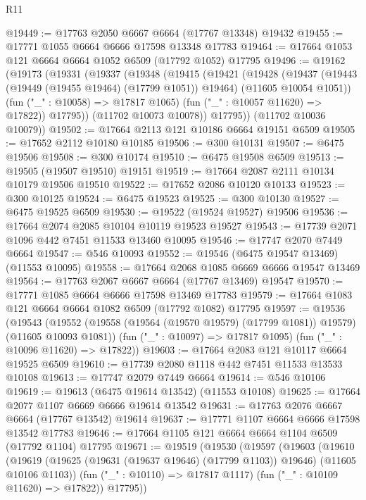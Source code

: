 \begin{lexlean}{R11}
\begin{coremodule}
{{{{{{{{{{{{{{{{{{{{{{{{{{{{{{{{{{{{{{{{{{{{{{{{{{{{{{{{{{{{{{{{{{{{{{{{{{{{{{{{{{@19449 := @17763 @2050 @6667 @6664 (@17767 @13348) @19432
@19455 := @17771 @1055 @6664 @6666 @17598 @13348 @17783
@19464 := @17664 @1053 @121 @6664 @6664 @1052 @6509 (@17792 @1052) @17795
@19496 := @19162
    (@19173
      (@19331
        (@19337
          (@19348
            (@19415
              (@19421
                (@19428
                  (@19437
                    (@19443 (@19449 (@19455 @19464) (@17799 @1051)) @19464)
                    (@11605 @10054 @1051))
                  (fun ("_" : @10058) => @17817 @1065)
                  (fun ("_" : @10057 @11620) => @17822))
                @17795))
            (@11702 @10073 @10078))
          @17795))
      (@11702 @10036 @10079))
@19502 := @17664 @2113 @121 @10186 @6664 @19151 @6509
@19505 := @17652 @2112 @10180 @10185
@19506 := @300 @10131
@19507 := @6475 @19506
@19508 := @300 @10174
@19510 := @6475 @19508 @6509
@19513 := @19505 (@19507 @19510) @19151
@19519 := @17664 @2087 @2111 @10134 @10179 @19506 @19510
@19522 := @17652 @2086 @10120 @10133
@19523 := @300 @10125
@19524 := @6475 @19523
@19525 := @300 @10130
@19527 := @6475 @19525 @6509
@19530 := @19522 (@19524 @19527) @19506
@19536 := @17664 @2074 @2085 @10104 @10119 @19523 @19527
@19543 := @17739 @2071 @1096 @442 @7451 @11533 @13460 @10095
@19546 := @17747 @2070 @7449 @6664
@19547 := @546 @10093
@19552 := @19546 (@6475 @19547 @13469) (@11553 @10095)
@19558 := @17664 @2068 @1085 @6669 @6666 @19547 @13469
@19564 := @17763 @2067 @6667 @6664 (@17767 @13469) @19547
@19570 := @17771 @1085 @6664 @6666 @17598 @13469 @17783
@19579 := @17664 @1083 @121 @6664 @6664 @1082 @6509 (@17792 @1082) @17795
@19597 := @19536
    (@19543
      (@19552 (@19558 (@19564 (@19570 @19579) (@17799 @1081)) @19579) (@11605 @10093 @1081))
      (fun ("_" : @10097) => @17817 @1095)
      (fun ("_" : @10096 @11620) => @17822))
@19603 := @17664 @2083 @121 @10117 @6664 @19525 @6509
@19610 := @17739 @2080 @1118 @442 @7451 @11533 @13533 @10108
@19613 := @17747 @2079 @7449 @6664
@19614 := @546 @10106
@19619 := @19613 (@6475 @19614 @13542) (@11553 @10108)
@19625 := @17664 @2077 @1107 @6669 @6666 @19614 @13542
@19631 := @17763 @2076 @6667 @6664 (@17767 @13542) @19614
@19637 := @17771 @1107 @6664 @6666 @17598 @13542 @17783
@19646 := @17664 @1105 @121 @6664 @6664 @1104 @6509 (@17792 @1104) @17795
@19671 := @19519
    (@19530
      (@19597
        (@19603
          (@19610
            (@19619 (@19625 (@19631 (@19637 @19646) (@17799 @1103)) @19646) (@11605 @10106 @1103))
            (fun ("_" : @10110) => @17817 @1117)
            (fun ("_" : @10109 @11620) => @17822))
          @17795))
}}}}}}}}}}}}}}}}}}}}}}}}}}}}}}}}}}}}}}}}}}}}}}}}}}}}}}}}}}}}}}}}}}}}}}}}}}}}}}}}}}
\end{coremodule}
\end{lexlean}
